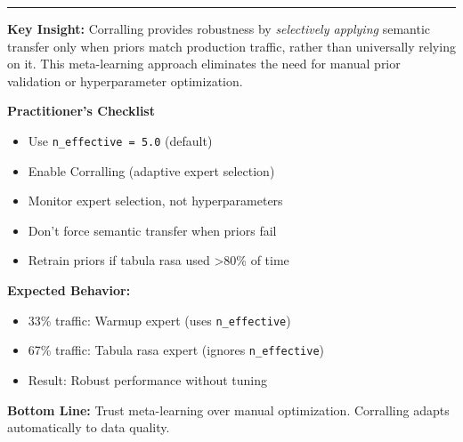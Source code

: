 \begin{tcolorbox}
\vspace{0.2cm}
\hrule
\vspace{0.2cm}

\textbf{Key Insight:} Corralling provides robustness by \textit{selectively applying} semantic transfer only when priors match production traffic, rather than universally relying on it. This meta-learning approach eliminates the need for manual prior validation or hyperparameter optimization.

\end{tcolorbox}



\begin{mdframed}[
    linecolor=blue!75!black,
    linewidth=2pt,
    roundcorner=5pt,
    backgroundcolor=blue!5!white,
    innertopmargin=10pt,
    innerbottommargin=10pt
]

\textbf{Practitioner's Checklist}

\begin{itemize}[leftmargin=*, itemsep=2pt]
    \item[\checkmark] Use \texttt{n\_effective = 5.0} (default)
    \item[\checkmark] Enable Corralling (adaptive expert selection)
    \item[\checkmark] Monitor expert selection, not hyperparameters
    \item[\checkmark] Don't force semantic transfer when priors fail
    \item[\checkmark] Retrain priors if tabula rasa used >80\% of time
\end{itemize}

\textbf{Expected Behavior:}
\begin{itemize}[leftmargin=*, itemsep=2pt]
    \item 33\% traffic: Warmup expert (uses \texttt{n\_effective})
    \item 67\% traffic: Tabula rasa expert (ignores \texttt{n\_effective})
    \item Result: Robust performance without tuning
\end{itemize}

\textbf{Bottom Line:} Trust meta-learning over manual optimization. Corralling adapts automatically to data quality.

\end{mdframed}


